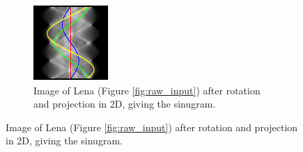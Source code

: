 \begin{figure}
\begin{subfigure}[t]{0.3\textwidth}
    \includegraphics[width=\textwidth]{Chapters/flopt/Figs/PDF/results/no_helix/sinugram_stretch}
    \caption{Image of Lena (Figure \ref{fig:raw_input}) after rotation and projection in 2D, giving the sinugram.}
    \label{fig:sinugram}
  \end{subfigure}
  \hfill
  \label{fig:rawinputs}
\end{figure}

